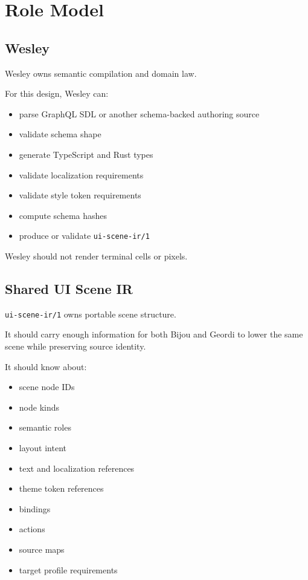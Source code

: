 \section{Role Model}\label{record-138-role-model}

\subsection{Wesley}\label{record-138-wesley}

Wesley owns semantic compilation and domain law.

For this design, Wesley can:

\begin{itemize}
\tightlist
\item
  parse GraphQL SDL or another schema-backed authoring source
\item
  validate schema shape
\item
  generate TypeScript and Rust types
\item
  validate localization requirements
\item
  validate style token requirements
\item
  compute schema hashes
\item
  produce or validate \texttt{u\allowbreak{}i\allowbreak{}-\allowbreak{}s\allowbreak{}c\allowbreak{}e\allowbreak{}n\allowbreak{}e\allowbreak{}-\allowbreak{}i\allowbreak{}r\allowbreak{}/\allowbreak{}1}
\end{itemize}

Wesley should not render terminal cells or pixels.

\subsection{Shared UI Scene IR}\label{record-138-shared-ui-scene-ir}

\texttt{u\allowbreak{}i\allowbreak{}-\allowbreak{}s\allowbreak{}c\allowbreak{}e\allowbreak{}n\allowbreak{}e\allowbreak{}-\allowbreak{}i\allowbreak{}r\allowbreak{}/\allowbreak{}1} owns portable scene structure.

It should carry enough information for both Bijou and Geordi to lower the same scene while preserving source identity.

It should know about:

\begin{itemize}
\tightlist
\item
  scene node IDs
\item
  node kinds
\item
  semantic roles
\item
  layout intent
\item
  text and localization references
\item
  theme token references
\item
  bindings
\item
  actions
\item
  source maps
\item
  target profile requirements
\end{itemize}

